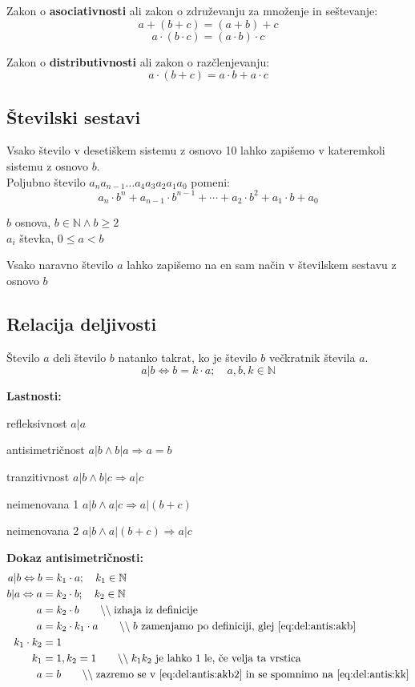 \documentclass[a4paper,oneside,12pt,fleqn]{article}
\def\N{\ensuremath{\mathbb N}}
\newcommand\krat\cdot
\newcommand{\comment}[1]{\ensuremath{\qquad\backslash\backslash\;}\textnormal{#1}}
\renewcommand\implies\Rightarrow
\renewcommand\iff\Leftrightarrow
\numberwithin{equation}{section}
\newenvironment{xlist}[1][\rule{0.75 cm}{0cm}]{%
\vspace{-14pt}
  \begin{list}{}{%
    \settowidth{\labelwidth}{#1:}
    \setlength{\labelsep}{0.5cm}
    \setlength{\leftmargin}{\labelwidth}
    \addtolength{\leftmargin}{\labelsep}
    \addtolength{\leftmargin}{20pt}
    \setlength{\rightmargin}{0pt}
    \setlength{\parsep}{0.5ex plus 0.2ex minus 0.1ex}
    \setlength{\itemsep}{0 ex plus 0.2ex}
    \renewcommand{\makelabel}[1]{##1:\hfil}
    }
  }
{\end{list}}
\begin{document}
Zakon o \textbf{asociativnosti} ali zakon o združevanju za množenje in seštevanje:
\[ a + (b + c) = (a + b) + c \]
\[ a \krat (b \krat c) = (a \krat b) \krat c \]

Zakon o \textbf{distributivnosti} ali zakon o razčlenjevanju:
\[ a \krat (b + c) = a \krat b + a \krat c \]


\subsection{Številski sestavi}
Vsako število v desetiškem sistemu z osnovo 10 lahko zapišemo v kateremkoli sistemu
z osnovo $b$. \\
Poljubno število $a_na_{n-1}\!\ldots a_4a_3a_2a_1a_0$ pomeni:
\[ a_n \krat b^n + a_{n-1} \krat b^{n-1} + \cdots + a_2 \krat b^2 +a_1 \krat b + a_0 \]

$b$ osnova, $b \in \N \land b \geq 2$ \\
$a_i$ števka, $0 \leq a < b$

Vsako naravno število $a$ lahko zapišemo na en sam način v številskem sestavu z osnovo $b$

\subsection{Relacija deljivosti}
Število $a$ deli število $b$ natanko takrat, ko je število $b$ večkratnik števila $a$.
\[ a | b \iff b = k \krat a;\quad a, b, k \in \N \]

\textbf{Lastnosti:}
\begin{xlist}[Antisimetričnost]
  \item[refleksivnost]       $a|a$
  \item[antisimetričnost]  $a|b \land b|a \implies a = b$
  \item[tranzitivnost]      $a|b \land b|c \implies a|c$
  \item[neimenovana 1]      $a|b \land a|c \implies a|\left( b+c \right)$
  \item[neimenovana 2]      $a|b \land a|\left( b+c \right) \implies a|c$
\end{xlist}

\textbf{Dokaz antisimetričnosti:}
\begin{align}
  a|b \iff b &= k_1 \krat a; \quad k_1 \in \N \\
  b|a \iff a &= k_2 \krat b; \quad k_2 \in \N \label{eq:del:antis:akb} \\
  a &= k_2 \krat b \comment{izhaja iz definicije} \label{eq:del:antis:akb2} \\
  a &= k_2 \krat k_1 \krat a \comment{$b$ zamenjamo po definiciji, glej \eqref{eq:del:antis:akb}} \\
  k_1 \krat k_2 &= 1 \\
  k_1 &= 1, k_2 = 1 \label{eq:del:antis:kk} \comment{$k_1k_2$ je lahko 1 le, če velja ta
  vrstica} \\
  a &= b \comment{zazremo se v \eqref{eq:del:antis:akb2} in se spomnimo na \eqref{eq:del:antis:kk}}
\end{align}
\end{document}
